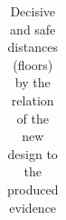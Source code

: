 \documentclass[pdflatex,sn-basic,lineno]{sn-jnl} %
\newcommand{\tabsize}{\fontsize{8}{9.5}\selectfont}
\providecommand{\DIFaddbeginFL}{} %
\providecommand{\DIFaddendFL}{} %
\providecommand{\DIFdelbeginFL}{} %
\providecommand{\DIFdelendFL}{} %
\newcommand{\DIFscaledelfig}{0.5}
\newlength{\DIFdelgraphicswidth} %
\newlength{\DIFdelgraphicsheight} %
\newcommand{\DIFaddincludegraphics}[2][]{{\color{blue}\fbox{\DIFOincludegraphics[#1]{#2}}}} %
\newcommand{\DIFdelincludegraphics}[2][]{%
\sbox{\DIFdelgraphicsbox}{\DIFOincludegraphics[#1]{#2}}%
\settoboxwidth{\DIFdelgraphicswidth}{\DIFdelgraphicsbox} %
\settoboxtotalheight{\DIFdelgraphicsheight}{\DIFdelgraphicsbox} %
\scalebox{\DIFscaledelfig}{%
\parbox[b]{\DIFdelgraphicswidth}{\usebox{\DIFdelgraphicsbox}\\[-\baselineskip] \rule{\DIFdelgraphicswidth}{0em}}\llap{\resizebox{\DIFdelgraphicswidth}{\DIFdelgraphicsheight}{%
\setlength{\unitlength}{\DIFdelgraphicswidth}%
\begin{picture}(1,1)%
\thicklines\linethickness{2pt} %
{\color[rgb]{1,0,0}\put(0,0){\framebox(1,1){}}}%
{\color[rgb]{1,0,0}\put(0,0){\line( 1,1){1}}}%
{\color[rgb]{1,0,0}\put(0,1){\line(1,-1){1}}}%
\end{picture}%
}\hspace*{3pt}}} %
} %
\DeclareRobustCommand{\DIFaddbeginFL}{\DIFOaddbeginFL \let\includegraphics\DIFaddincludegraphics} %
\DeclareRobustCommand{\DIFaddendFL}{\DIFOaddendFL \let\includegraphics\DIFOincludegraphics} %
\DeclareRobustCommand{\DIFdelbeginFL}{\DIFOdelbeginFL \let\includegraphics\DIFdelincludegraphics} %
\DeclareRobustCommand{\DIFdelendFL}{\DIFOaddendFL \let\includegraphics\DIFOincludegraphics} %
\begin{document}
\begin{table}[t]
\tabsize
\DIFdelbeginFL %
\DIFdelendFL \DIFaddbeginFL \setlength{\tabcolsep}{2.2pt}
\DIFaddendFL \caption{Decisive and safe distances (floors) by the relation of the new design to the produced evidence}\label{tab:distances}
\DIFdelbeginFL %
\DIFdelendFL \DIFaddbeginFL \begin{tabular}{@{}lrrrrrrrrrr@{}}

\end{tabular}
\end{table}
\end{document}
